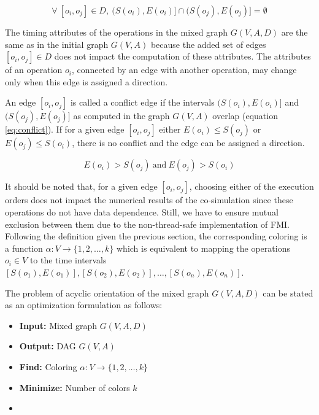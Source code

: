 \begin{equation}
\forall\ [o_i,o_j] \in D,\  (S(o_i), E(o_i)] \cap (S(o_j), E(o_j)] = \emptyset
\label{eq:color5}
\end{equation}

The timing attributes of the operations in the mixed graph $G(V,A,D)$ are the same as in the initial graph $G(V,A)$ because the added set of edges $[o_i, o_j] \in D$ does not impact the computation of these attributes. The attributes of an operation $o_i$, connected by an edge with another operation, may change only when this edge is assigned a direction. 

An edge $[o_i,o_j]$ is called a conflict edge if the intervals $(S(o_i), E(o_i)]$ and $(S(o_j), E(o_j)]$ as computed in the graph $G(V,A)$ overlap (equation \ref{eq:conflict}). If for a given edge $[o_i,o_j]$ either $E(o_i) \leq S(o_j)$ or $E(o_j) \leq S(o_i)$, there is no conflict and the edge can be assigned a direction. 

\begin{equation}
E(o_i) > S(o_j)\ \text{and}\ E(o_j) > S(o_i)
\label{eq:conflict}
\end{equation}

It should be noted that, for a given edge $[o_i, o_j]$, choosing either of the execution orders does not impact the numerical results of the co-simulation since these operations do not have data dependence. Still, we have to ensure mutual exclusion between them due to the non-thread-safe implementation of FMI. Following the definition given the previous section, the corresponding coloring is a function $\alpha: V \rightarrow \{1, 2, \ldots, k\}$ which is equivalent to mapping the operations $o_i \in V$ to the time intervals $[S(o_1), E(o_1)], [S(o_2), E(o_2)], \ldots, [S(o_n), E(o_n)]$.

The problem of acyclic orientation of the mixed graph $G(V,A,D)$ can be stated as an optimization formulation as follows:

\begin{itemize}[label={},topsep=1pt,parsep=1pt,partopsep=1pt,leftmargin=*]	
\item \textbf{Input:} Mixed graph $G(V,A,D)$
\item \textbf{Output:} DAG $G(V,A)$
\item \textbf{Find:} Coloring $\alpha: V \rightarrow \{1, 2, \ldots, k\}$
\item \textbf{Minimize:} Number of colors $k$
\item {}
\end{itemize}

